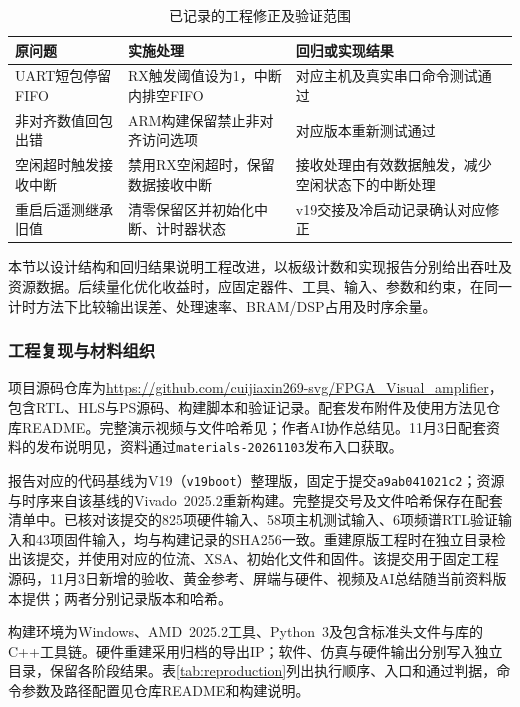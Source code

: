 \begin{table}[htbp]
\centering\small
\caption{已记录的工程修正及验证范围}\label{tab:engineering-revisions}
\begin{tabularx}{\linewidth}{@{}p{3cm}X X@{}}
\toprule
原问题 & 实施处理 & 回归或实现结果 \\
\midrule
UART短包停留FIFO & RX触发阈值设为1，中断内排空FIFO & 对应主机及真实串口命令测试通过 \\
非对齐数值回包出错 & ARM构建保留禁止非对齐访问选项 & 对应版本重新测试通过 \\
空闲超时触发接收中断 & 禁用RX空闲超时，保留数据接收中断 & 接收处理由有效数据触发，减少空闲状态下的中断处理 \\
重启后遥测继承旧值 & 清零保留区并初始化中断、计时器状态 & v19交接及冷启动记录确认对应修正 \\
\bottomrule
\end{tabularx}
\end{table}

本节以设计结构和回归结果说明工程改进，以板级计数和实现报告分别给出吞吐及资源数据。后续量化优化收益时，应固定器件、工具、输入、参数和约束，在同一计时方法下比较输出误差、处理速率、BRAM/DSP占用及时序余量。

\subsubsection{工程复现与材料组织}
\label{sec:reproduction}
项目源码仓库为\url{https://github.com/cuijiaxin269-svg/FPGA_Visual_amplifier}，包含RTL、HLS与PS源码、构建脚本和验证记录。配套发布附件及使用方法见仓库README。完整演示视频与文件哈希见；作者AI协作总结见。11月3日配套资料的发布说明见，资料通过\texttt{materials-20261103}发布入口获取。

报告对应的代码基线为V19（\texttt{v19boot}）整理版，固定于提交\texttt{a9ab041021c2}；资源与时序来自该基线的Vivado~2025.2重新构建。完整提交号及文件哈希保存在配套清单中。已核对该提交的825项硬件输入、58项主机测试输入、6项频谱RTL验证输入和43项固件输入，均与构建记录的SHA256一致。重建原版工程时在独立目录检出该提交，并使用对应的位流、XSA、初始化文件和固件。该提交用于固定工程源码，11月3日新增的验收、黄金参考、屏端与硬件、视频及AI总结随当前资料版本提供；两者分别记录版本和哈希。

构建环境为Windows、AMD~2025.2工具、Python~3及包含标准头文件与库的C++工具链。硬件重建采用归档的导出IP；软件、仿真与硬件输出分别写入独立目录，保留各阶段结果。表\ref{tab:reproduction}列出执行顺序、入口和通过判据，命令参数及路径配置见仓库README和构建说明\cite{repo}。

